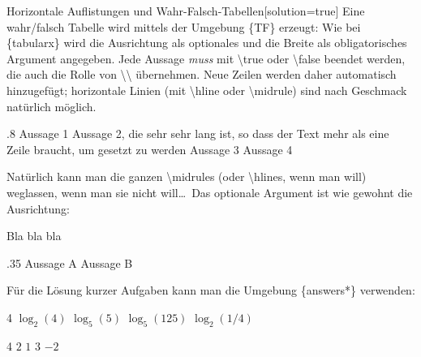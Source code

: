 \documentclass[hyperworksheet,pgfplots]{drcschool}
\newcommand*{\cs}[1]{\textup{\ttfamily\textbackslash#1}}                   %
\newcommand*{\env}[1]{\textup{\ttfamily\{#1\}}}                            %
\begin{document}
\begin{worksheet}{Horizontale Auflistungen und Wahr-Falsch-Tabellen}[solution=true]
Eine wahr/falsch Tabelle wird mittels der Umgebung \env{TF} erzeugt:
Wie bei \env{tabularx} wird die Ausrichtung als optionales und die Breite
als obligatorisches Argument angegeben. Jede Aussage \emph{muss} mit \cs{true} oder
\cs{false} beendet werden, die auch die Rolle von \cs{\textbackslash} übernehmen.
Neue Zeilen werden daher automatisch hinzugefügt;
horizontale Linien (mit \cs{hline} oder \cs{midrule}) sind nach Geschmack natürlich möglich.
\begin{center}
\begin{TF}{.8\linewidth}
Aussage 1 \true
\midrule
Aussage 2, die sehr sehr lang ist, so dass der Text mehr als eine Zeile braucht, um gesetzt zu werden \false
\midrule
Aussage 3 \false
\midrule
Aussage 4 \true
\end{TF}
\end{center}
Natürlich kann man die ganzen \cs{midrule}s (oder \cs{hline}s, wenn man will) weglassen,
wenn man sie nicht will\ldots\ Das optionale Argument ist wie gewohnt die Ausrichtung:
\begin{center}
Bla bla bla
\begin{TF}[t]{.35\linewidth}
Aussage A \true
Aussage B \false
\end{TF}
\end{center}

Für die Lösung kurzer Aufgaben kann man die Umgebung \env{answers*} verwenden:
\begin{questions*}{4}
\question $\log_2(4)$
\question $\log_5(5)$
\question $\log_5(125)$
\question $\log_2(1/4)$
\end{questions*}
\begin{solution}
\begin{answers*}{4}
\answer $2$
\answer $1$
\answer $3$
\answer $-2$
\end{answers*}
\end{solution}
\end{worksheet}

\end{document}
